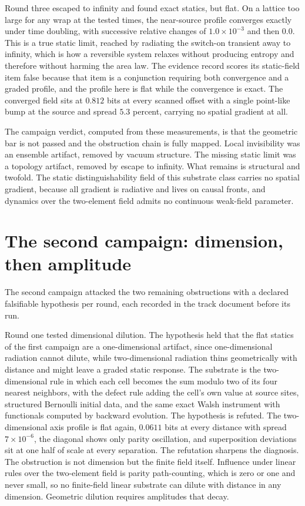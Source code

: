\documentclass[aps,pre,reprint,nofootinbib]{revtex4-2}
\begin{document}
Round three escaped to infinity and found exact statics, but flat.
On a lattice too large for any wrap at the tested times, the
near-source profile converges exactly under time doubling, with
successive relative changes of $1.0\times10^{-3}$ and then $0.0$.
This is a true static limit, reached by radiating the switch-on
transient away to infinity, which is how a reversible system relaxes
without producing entropy and therefore without harming the area
law.  The evidence record scores its static-field item false
because that item is a conjunction requiring both convergence and a
graded profile, and the profile here is flat while the convergence
is exact.  The converged field sits at $0.812$
bits at every scanned offset with a single point-like bump at the
source and spread $5.3$ percent, carrying no spatial gradient at
all.

The campaign verdict, computed from these measurements, is that the
geometric bar is not passed and the obstruction chain is fully
mapped.  Local invisibility was an ensemble artifact, removed by
vacuum structure.  The missing static limit was a topology artifact,
removed by escape to infinity.  What remains is structural and
twofold.  The static distinguishability field of this substrate
class carries no spatial gradient, because all gradient is
radiative and lives on causal fronts, and dynamics over the
two-element field admits no continuous weak-field parameter.

\section{The second campaign: dimension, then amplitude}
\label{sec:eg4c}

The second campaign attacked the two remaining obstructions with a
declared falsifiable hypothesis per round, each recorded in the
track document before its run.

Round one tested dimensional dilution.  The hypothesis held that the
flat statics of the first campaign are a one-dimensional artifact,
since one-dimensional radiation cannot dilute, while two-dimensional
radiation thins geometrically with distance and might leave a graded
static response.  The substrate is the two-dimensional rule in which
each cell becomes the sum modulo two of its four nearest neighbors,
with the defect rule adding the cell's own value at source sites,
structured Bernoulli initial data, and the same exact Walsh
instrument with functionals computed by backward evolution.  The
hypothesis is refuted.  The two-dimensional axis profile is flat
again, $0.0611$ bits at every distance with spread $7\times10^{-6}$,
the diagonal shows only parity oscillation, and superposition
deviations sit at one half of scale at every separation.  The
refutation sharpens the diagnosis.  The obstruction is not dimension
but the finite field itself.  Influence under linear rules over the
two-element field is parity path-counting, which is zero or one and
never small, so no finite-field linear substrate can dilute with
distance in any dimension.  Geometric dilution requires amplitudes
that decay.
\end{document}
